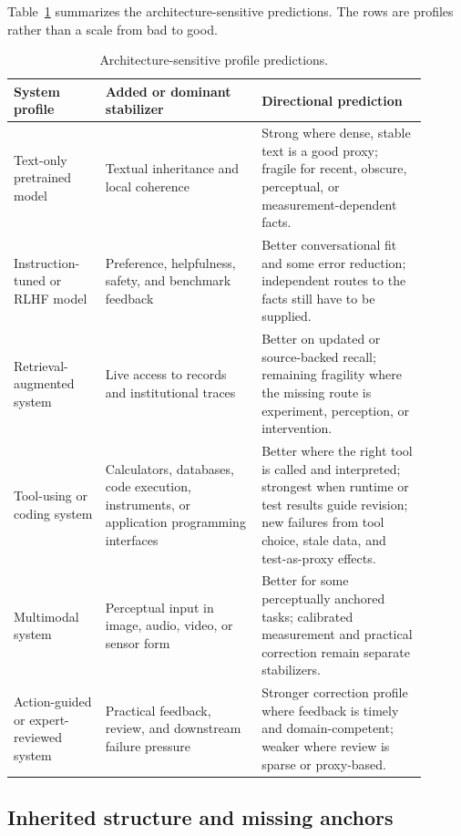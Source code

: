 \documentclass[12pt]{article}
\begin{document}
Table~\ref{tab:llm-profiles} summarizes the architecture-sensitive predictions. The rows
are profiles rather than a scale from bad to good.

\begin{table}[H]
\centering
\small
\begin{tabular}{@{}>{\raggedright\arraybackslash}p{0.20\linewidth}>{\raggedright\arraybackslash}p{0.34\linewidth}>{\raggedright\arraybackslash}p{0.36\linewidth}@{}}
\toprule
System profile & Added or dominant stabilizer & Directional prediction \\
\midrule
Text-only pretrained model & Textual inheritance and local coherence & Strong where dense,
stable text is a good proxy; fragile for recent, obscure, perceptual, or measurement-dependent facts. \\
Instruction-tuned or RLHF model & Preference, helpfulness, safety, and benchmark feedback & Better conversational fit and some error reduction; independent routes to the facts still have to be supplied. \\
Retrieval-augmented system & Live access to records and institutional traces & Better on updated or source-backed recall; remaining fragility where the missing route is experiment, perception, or intervention. \\
Tool-using or coding system & Calculators, databases, code execution, instruments, or application programming interfaces & Better where the right tool is called and interpreted; strongest when runtime or test results guide revision; new failures from tool choice, stale data, and test-as-proxy effects. \\
Multimodal system & Perceptual input in image, audio, video, or sensor form & Better for some perceptually anchored tasks; calibrated measurement and practical correction remain separate stabilizers. \\
Action-guided or expert-reviewed system & Practical feedback, review, and downstream failure pressure & Stronger correction profile where feedback is timely and domain-competent; weaker where review is sparse or proxy-based. \\
\bottomrule
\end{tabular}
\caption{Architecture-sensitive profile predictions.}
\label{tab:llm-profiles}
\end{table}

\subsection{Inherited structure and missing anchors}
\end{document}
